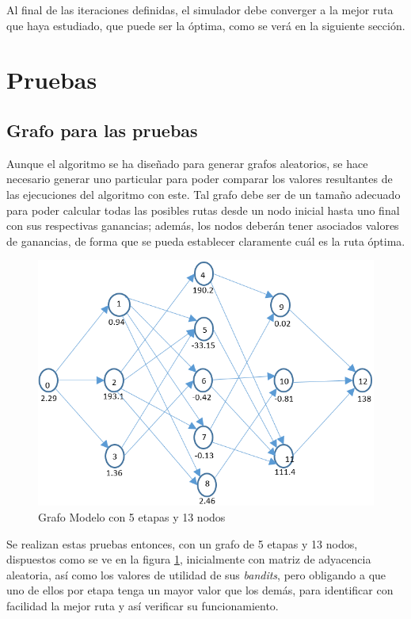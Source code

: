 Al final de las iteraciones definidas, el simulador debe converger a la mejor ruta que haya estudiado, que puede ser la óptima, como se verá en la siguiente sección.

\section{Pruebas}

\subsection{Grafo para las pruebas}

Aunque el algoritmo se ha diseñado para generar grafos aleatorios, se hace necesario generar uno particular para poder comparar los valores resultantes de las ejecuciones del algoritmo con este. Tal grafo debe ser de un tamaño adecuado para poder calcular todas las posibles rutas desde un nodo inicial hasta uno final con sus respectivas ganancias; además, los nodos deberán tener asociados valores de ganancias, de forma que se pueda establecer claramente cuál es la ruta óptima.

\begin{figure}[h]
  \centering
    \includegraphics[scale=0.5]{Grafo5L.png}
  \caption[Grafo Modelo]{Grafo Modelo con 5 etapas y 13 nodos}
  \label{Grafomodelo}
\end{figure}

Se realizan estas pruebas entonces, con un grafo de 5 etapas y 13 nodos, dispuestos como se ve en la figura \ref{Grafomodelo}, inicialmente con matriz de adyacencia aleatoria, así como los valores de utilidad de sus \textit{bandits}, pero obligando a que uno de ellos por etapa tenga un mayor valor que los demás, para identificar con facilidad la mejor ruta y así verificar su funcionamiento.


